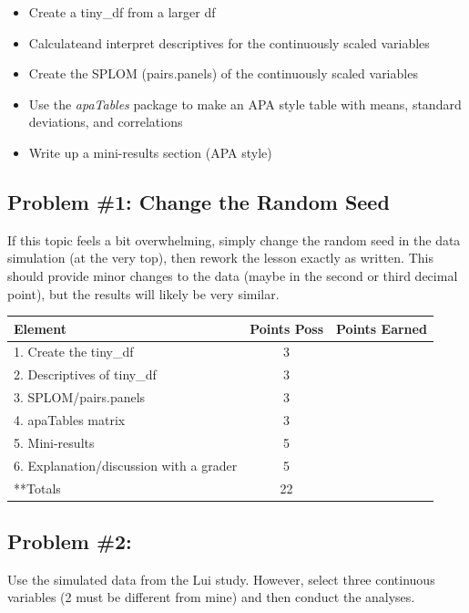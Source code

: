\documentclass[
  english,
]{book}
\providecommand{\tightlist}{%
  \setlength{\itemsep}{0pt}\setlength{\parskip}{0pt}}
\begin{document}
\begin{itemize}
\tightlist
\item
  Create a tiny\_df from a larger df
\item
  Calculateand interpret descriptives for the continuously scaled variables
\item
  Create the SPLOM (pairs.panels) of the continuously scaled variables
\item
  Use the \emph{apaTables} package to make an APA style table with means, standard deviations, and correlations
\item
  Write up a mini-results section (APA style)
\end{itemize}

\hypertarget{problem-1-change-the-random-seed}{%
\subsection{Problem \#1: Change the Random Seed}\label{problem-1-change-the-random-seed}}

If this topic feels a bit overwhelming, simply change the random seed in the data simulation (at the very top), then rework the lesson exactly as written. This should provide minor changes to the data (maybe in the second or third decimal point), but the results will likely be very similar.

\begin{longtable}[]{@{}lcl@{}}
\toprule
Element & Points Poss & Points Earned \\
\midrule
\endhead
1. Create the tiny\_df & 3 & \\
2. Descriptives of tiny\_df & 3 & \\
3. SPLOM/pairs.panels & 3 & \\
4. apaTables matrix & 3 & \\
5. Mini-results & 5 & \\
6. Explanation/discussion with a grader & 5 & \\
**Totals & 22 & \\
\bottomrule
\end{longtable}

\hypertarget{problem-2}{%
\subsection{Problem \#2:}\label{problem-2}}

Use the simulated data from the Lui \citeyearpar{lui_racial_2020} study. However, select three continuous variables (2 must be different from mine) and then conduct the analyses.
\end{document}
